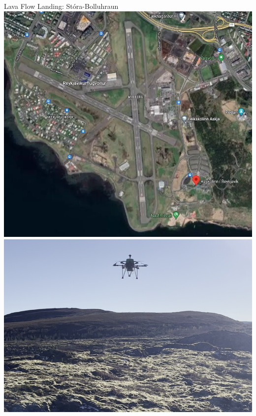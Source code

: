 \documentclass[aspectratio=169]{beamer}
\begin{document}
\begin{frame}{Lava Flow Landing: Stóra-Bolluhraun}
	\centering
	\includegraphics[height=0.65\textheight]{./images/reykjavik_university_no_fly_zone}
	\includegraphics[height=0.65\textheight]{./images/depth_drone_flying}
\end{frame}
\end{document}
